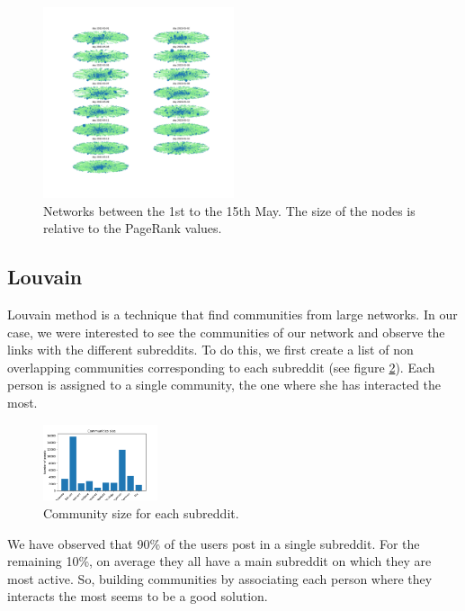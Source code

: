 \begin{figure}[ht!]
    \centering
    \includegraphics[width=0.5\textwidth]{figures/rank_days.pdf}
    \caption{Networks between the 1st to the 15th May. The size of the nodes is relative to the PageRank values.}
    \label{fig:rankdays}
\end{figure}

\subsection{Louvain}
Louvain method is a technique that find communities from large networks. In our case, we were interested to see the communities of our network and observe the links with the different subreddits. To do this, we first create a list of non overlapping communities corresponding to each subreddit (see figure \ref{fig:communitiessize}). Each person is assigned to a single community, the one where she has interacted the most.

\begin{figure}[ht!]
    \centering
    \includegraphics[width=0.3\textwidth]{figures/communities_size.pdf}
    \caption{Community size for each subreddit.}
    \label{fig:communitiessize}
\end{figure}

We have observed that 90\% of the users post in a single subreddit. For the remaining 10\%, on average they all have a main subreddit on which they are most active. So, building communities by associating each person where they interacts the most seems to be a good solution. 

